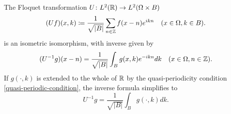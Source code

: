 \begin{theorem} \label{3.2:thm-UIsometricIsomorphism}
	The Floquet transformation $U \colon L^{2}(\mathbb{R}) \rightarrow L^{2}(\Omega \times B)$ 
	\begin{equation}
		(Uf)(x, k) \coloneqq \frac{1}{\sqrt{|B|}} \sum_{n \in \mathbb{Z}} f(x - n) e^{ikn} \quad (x \in \Omega, k \in B). \label{floquet-transformation}
	\end{equation}
	is an isometric isomorphism, with inverse given by
		\begin{equation}
			(U^{-1}g)(x - n) = \frac{1}{\sqrt{|B|}} \int_{B} g(x, k) e^{-ikn} dk \quad (x \in \Omega, n \in \mathbb{Z}). \label{3.8}
		\end{equation} 
	If $g(\cdot, k)$ is extended to the whole of $\mathbb{R}$ by the quasi-periodicity condition \eqref{quasi-periodic-condition}, the inverse formula simplifies to
		\begin{equation}
			U^{-1} g = \frac{1}{\sqrt{|B|}} \int_{B} g(\cdot, k) dk. \label{3.9}
		\end{equation}
		

\end{theorem}
